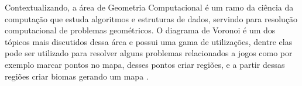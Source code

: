




Contextualizando, a área de Geometria Computacional é um ramo da ciência da computação que estuda algoritmos e estruturas de dados, servindo para resolução computacional de problemas geométricos. O diagrama de Voronoi é um dos tópicos mais discutidos dessa
área e possui uma gama de utilizações, dentre elas pode ser utilizado para resolver alguns problemas relacionados a jogos como por exemplo marcar pontos no mapa, desses pontos criar regiões, e a partir dessas regiões criar biomas gerando um mapa \space\cite{diagrama_voronoi_jogos}.


